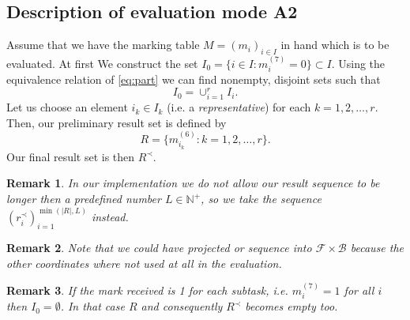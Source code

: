 \documentclass{scrartcl}
\newtheorem{remark}{Remark}
\begin{document}
\subsection{Description of evaluation mode A2}
Assume that we have the marking table $M=(m_i)_{i\in I}$ in hand which is to be evaluated. At first We construct the set $I_0=\{i\in I: m_i^{(7)}=0\}\subset I$. Using the equivalence relation of \ref{eq:part} we can find nonempty, disjoint sets such that $$I_0=\cup_{i=1}^rI_i.$$ Let us choose an element $i_k\in I_k$ (i.e. a \emph{representative}) for each $k=1,2,\ldots,r$. Then, our preliminary result set is defined by
$$R=\{m^{(6)}_{i_k}:k=1,2,\ldots,r\}.$$
Our final result set is then $R^{\prec}$.
\begin{remark}
In our implementation we do not allow our result sequence to be longer then a predefined number $L\in\mathbb{N}^+$, so we take the sequence $(r^{\prec}_i)_{i=1}^{\min(|R|,L)}$ instead.    
\end{remark}
\begin{remark}
Note that we could have projected or sequence into $\mathcal{F}\times\mathcal{B}$ because the other coordinates where not used at all in the evaluation.
\end{remark}
\begin{remark}
If the mark received is 1 for each subtask, i.e. $m^{(7)}_i=1$ for all $i$ then $I_0=\emptyset$. In that case $R$ and consequently $R^{\prec}$ becomes empty too.
\end{remark} 
\end{document}
